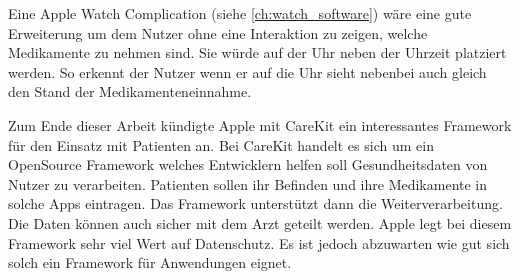 Eine Apple Watch Complication (siehe \ref{ch:watch_software}) wäre eine gute Erweiterung um dem Nutzer ohne eine Interaktion zu zeigen, welche Medikamente zu nehmen sind. Sie würde auf der Uhr neben der Uhrzeit platziert werden. So erkennt der Nutzer wenn er auf die Uhr sieht nebenbei auch gleich den Stand der Medikamenteneinnahme.

Zum Ende dieser Arbeit kündigte Apple mit CareKit \cite{Apple:2016:careKit} ein interessantes Framework für den Einsatz mit Patienten an. Bei CareKit handelt es sich um ein OpenSource Framework welches Entwicklern helfen soll Gesundheitsdaten von Nutzer zu verarbeiten. Patienten sollen ihr Befinden und ihre Medikamente in solche Apps eintragen. Das Framework unterstützt dann die Weiterverarbeitung. Die Daten können auch sicher mit dem Arzt geteilt werden. Apple legt bei diesem Framework sehr viel Wert auf Datenschutz. Es ist jedoch abzuwarten wie gut sich solch ein Framework für Anwendungen eignet.

